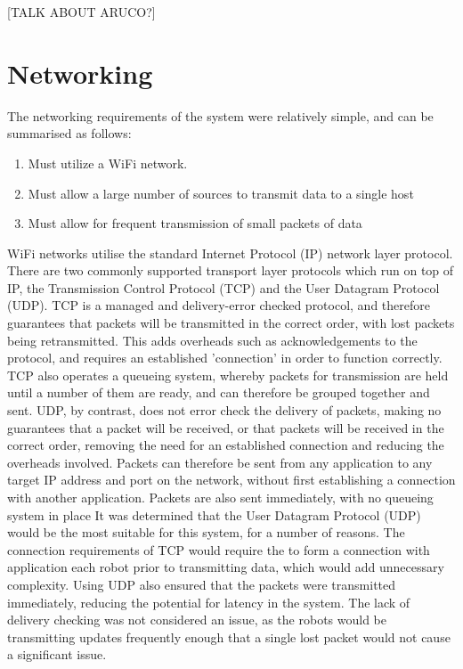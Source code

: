 [TALK ABOUT ARUCO?]


\section{Networking}
The networking requirements of the system were relatively simple, and can be summarised as follows:

\begin{enumerate}
	\item Must utilize a WiFi network.
	\item Must allow a large number of sources to transmit data to a single host
	\item Must allow for frequent transmission of small packets of data
\end{enumerate}

WiFi networks utilise the standard Internet Protocol (IP) network layer protocol. There are two commonly supported transport layer protocols which run on top of IP, the Transmission Control Protocol (TCP) and the User Datagram Protocol (UDP). TCP is a managed and delivery-error checked protocol, and therefore guarantees that packets will be transmitted in the correct order, with lost packets being retransmitted. This adds overheads such as acknowledgements to the protocol, and requires an established 'connection' in order to function correctly. TCP also operates a queueing system, whereby packets for transmission are held until a number of them are ready, and can therefore be grouped together and sent. UDP, by contrast, does not error check the delivery of packets, making no guarantees that a packet will be received, or that packets will be received in the correct order, removing the need for an established connection and reducing the overheads involved. Packets can therefore be sent from any application to any target IP address and port on the network, without first establishing a connection with another application. Packets are also sent immediately, with no queueing system in place It was determined that the User Datagram Protocol (UDP) would be the most suitable for this system, for a number of reasons. The connection requirements of TCP would require the to form a connection with application each robot prior to transmitting data, which would add unnecessary complexity. Using UDP also ensured that the packets were transmitted immediately, reducing the potential for latency in the system. The lack of delivery checking was not considered an issue, as the robots would be transmitting updates frequently enough that a single lost packet would not cause a significant issue.

